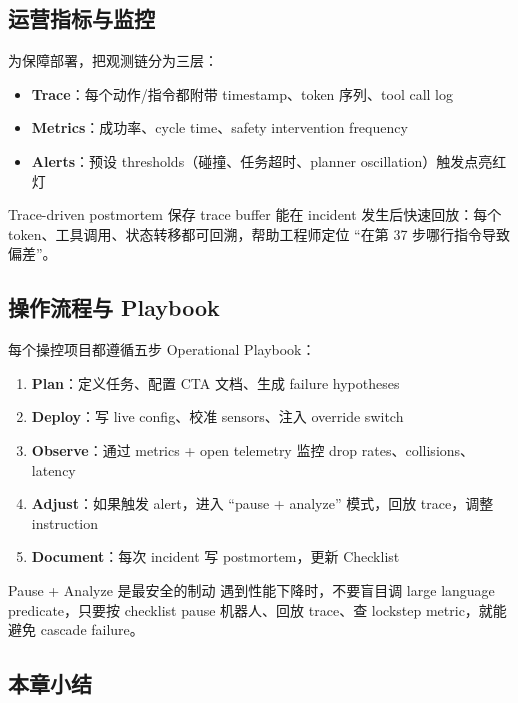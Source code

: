 \documentclass[a4paper]{article}
\begin{document}
\subsection{运营指标与监控}

为保障部署，把观测链分为三层：

\begin{itemize}
    \item \textbf{Trace}：每个动作/指令都附带 timestamp、token 序列、tool call log
    \item \textbf{Metrics}：成功率、cycle time、safety intervention frequency
    \item \textbf{Alerts}：预设 thresholds（碰撞、任务超时、planner oscillation）触发点亮红灯
\end{itemize}

\begin{knowledgebox}{Trace-driven postmortem}
保存 trace buffer 能在 incident 发生后快速回放：每个 token、工具调用、状态转移都可回溯，帮助工程师定位 ``在第 37 步哪行指令导致偏差''。
\end{knowledgebox}

\subsection{操作流程与 Playbook}

每个操控项目都遵循五步 Operational Playbook：

\begin{enumerate}
    \item \textbf{Plan}：定义任务、配置 CTA 文档、生成 failure hypotheses
    \item \textbf{Deploy}：写 live config、校准 sensors、注入 override switch
    \item \textbf{Observe}：通过 metrics + open telemetry 监控 drop rates、collisions、latency
    \item \textbf{Adjust}：如果触发 alert，进入 “pause + analyze” 模式，回放 trace，调整 instruction
    \item \textbf{Document}：每次 incident 写 postmortem，更新 Checklist
\end{enumerate}

\begin{warningbox}{Pause + Analyze 是最安全的制动}
遇到性能下降时，不要盲目调 large language predicate，只要按 checklist pause 机器人、回放 trace、查 lockstep metric，就能避免 cascade failure。
\end{warningbox}

\subsection{本章小结}
\end{document}
